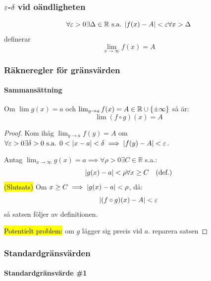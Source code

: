 \subsubsection{\texorpdfstring{$\varepsilon$-$\delta$}{Epsilon-Delta} vid oändligheten}
$$
	\forall\varepsilon>0\exists\Delta\in\mathbb{R}\text{ s.a. }\qty|f(x)-A|<\varepsilon\forall x>\Delta
$$
definerar
$$
	\lim_{x\to\infty}f(x)=A
$$


\subsubsection{Räkneregler för gränsvärden}

\paragraph{Sammansättning}
\begin{theorem}
	Om $\lim g(x)=a$ och $\lim_{y\to a}f(x)=A\in\mathbb{R}\cup\qty{\pm\infty}$ så är:
	$$
		\lim (f\circ g)(x)=A
	$$

	\begin{proof}
		Kom ihåg $\lim_{y\to a} f(y)=A$ om $\forall\varepsilon>0\exists\delta>0\text{ s.a. }0<\qty|x-a|<\delta\implies\qty|f(y)-A|<\varepsilon$.

		Antag $\lim_{x\to\infty} g(x)=a\implies\forall\rho>0\exists C\in\mathbb{R}$ s.a.:
		$$
			\qty|g(x)-a|<\rho\forall x\geq C\quad\text{(def.)}
		$$
		\hl{(Slutsats)} Om $x\geq C\implies\qty|g(x)-a|<\rho$, då:
		$$
			\qty|(f\circ g)(x)-A|<\varepsilon
		$$
		så satsen följer av definitionen.

		\hl{Potentielt problem:} om $g$ lägger sig precis vid $a$. reparera satsen
	\end{proof}
\end{theorem}


\subsubsection{Standardgränsvärden}

\paragraph{Standardgränsvärde \#1}

